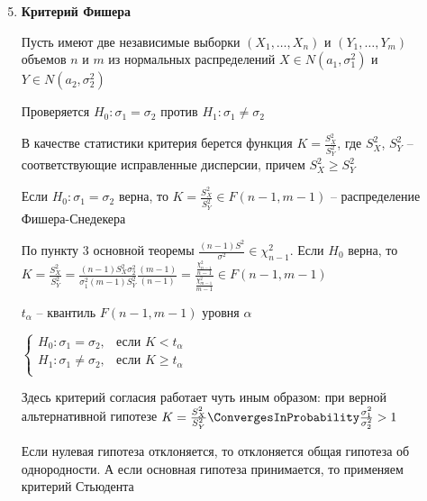 \begin{enumerate}[label*=\Roman*. ]
    \setcounter{enumi}{4}

    \hypertarget{fishers_criterion}{}

    \item \textbf{Критерий Фишера}

    Пусть имеют две независимые выборки $(X_1, \dots, X_n)$ и $(Y_1, \dots, Y_m)$ объемов $n$ и $m$ из нормальных распределений $X \in N(a_1, \sigma^2_1)$ и $Y \in N(a_2, \sigma^2_2)$

    Проверяется $H_0 : \sigma_1 = \sigma_2$ против $H_1 : \sigma_1 \neq \sigma_2$

    В качестве статистики критерия берется функция $K = \frac{S_X^2}{S_Y^2}$, где $S_X^2$, $S_Y^2$ -- соответствующие исправленные дисперсии, причем
    $S_X^2 \geq S_Y^2$

    \begin{MyTheorem}
        \Ths Если $H_0 : \sigma_1 = \sigma_2$ верна, то $K = \frac{S_X^2}{S_Y^2} \in F(n - 1, m - 1)$ -- распределение Фишера-Снедекера
    \end{MyTheorem}

    \begin{MyProof}
        По пункту 3 основной теоремы $\frac{(n - 1)S^2}{\sigma^2} \in \chi^2_{n - 1}$. Если $H_0$ верна, то $K = \frac{S_X^2}{S_Y^2} = \frac{(n - 1) S_X^2 \sigma_2^2}{\sigma_1^2 (m - 1) S_Y^2} \frac{(m - 1)}{(n - 1)} = \frac{\frac{\chi^2_{n - 1}}{n - 1}}{\frac{\chi^2_{m - 1}}{m - 1}} \in F(n - 1, m - 1)$
    \end{MyProof}

    $t_\alpha$ -- квантиль $F(n - 1, m - 1)$ уровня $\alpha$

    $\begin{cases}
        H_0 : \sigma_1 = \sigma_2, & \text{если } K < t_\alpha \\
        H_1 : \sigma_1 \neq \sigma_2, & \text{если } K \geq t_\alpha \\
    \end{cases}$

    \Nota Здесь критерий согласия работает чуть иным образом: при верной альтернативной гипотезе $K = \frac{S_X^2}{S_Y^2} \ConvergesInProbability \frac{\sigma_1^2}{\sigma_2^2} > 1$

    Если нулевая гипотеза отклоняется, то отклоняется общая гипотеза об однородности. А если основная гипотеза принимается, то 
    применяем критерий Стьюдента

    \hypertarget{students_criterion}{}


\end{enumerate}
